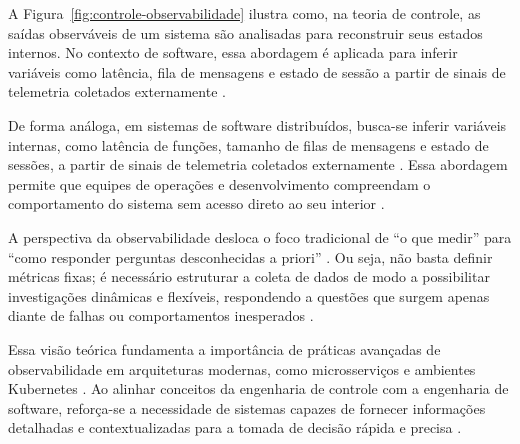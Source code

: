 A Figura~\ref{fig:controle-observabilidade} ilustra como, na teoria de controle, as saídas observáveis de um sistema são analisadas para reconstruir seus estados internos. No contexto de software, essa abordagem é aplicada para inferir variáveis como latência, fila de mensagens e estado de sessão a partir de sinais de telemetria coletados externamente \cite{observability2023}.

De forma análoga, em sistemas de software distribuídos, busca-se inferir variáveis internas, como latência de funções, tamanho de filas de mensagens e estado de sessões, a partir de sinais de telemetria coletados externamente \cite{observability2023}. Essa abordagem permite que equipes de operações e desenvolvimento compreendam o comportamento do sistema sem acesso direto ao seu interior \cite{observability2023}.

A perspectiva da observabilidade desloca o foco tradicional de “o que medir” para “como responder perguntas desconhecidas a priori” \cite{observability2023}. Ou seja, não basta definir métricas fixas; é necessário estruturar a coleta de dados de modo a possibilitar investigações dinâmicas e flexíveis, respondendo a questões que surgem apenas diante de falhas ou comportamentos inesperados \cite{observability2023}.

Essa visão teórica fundamenta a importância de práticas avançadas de observabilidade em arquiteturas modernas, como microsserviços e ambientes Kubernetes \cite{observability2023}. Ao alinhar conceitos da engenharia de controle com a engenharia de software, reforça-se a necessidade de sistemas capazes de fornecer informações detalhadas e contextualizadas para a tomada de decisão rápida e precisa \cite{observability2023}.



